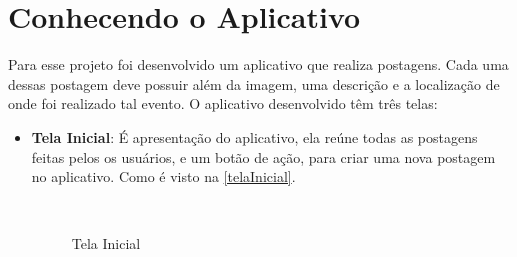 \section{Conhecendo o Aplicativo}
Para esse projeto foi desenvolvido um aplicativo que realiza postagens. Cada uma dessas postagem deve possuir além da  imagem, uma descrição e a localização de onde foi realizado tal evento. O aplicativo desenvolvido têm três telas:
\begin{itemize}
	\item \textbf{Tela Inicial}: É  apresentação do aplicativo, ela reúne todas as postagens feitas pelos os usuários, e um botão de ação, para criar uma nova postagem no aplicativo. Como é visto na 
	\autoref{telaInicial}.
	\begin{figure}[!htpb]
		\centering
		\caption{Tela Inicial}
		\\

\end{figure}
\end{itemize}

